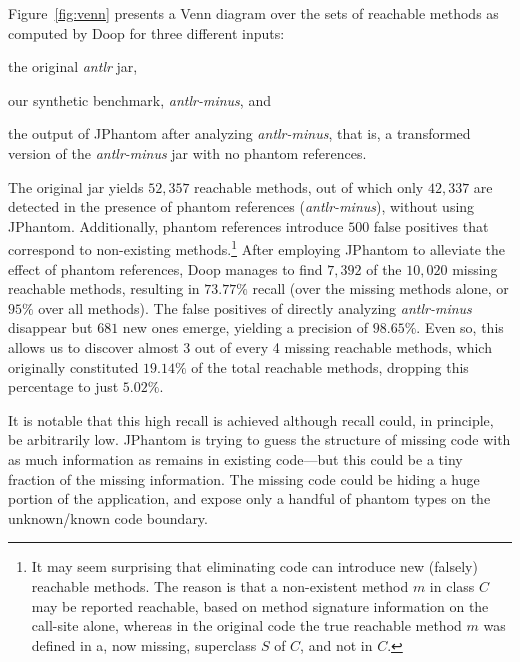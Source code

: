 \begin{itemize}
  Figure~\ref{fig:venn} presents a Venn diagram over the sets of
  reachable methods as computed by Doop for three different
  inputs:%
  \begin{inparaenum}[(i)]
  \item the original \emph{antlr} jar,
  \item our synthetic benchmark, \emph{antlr-minus}, and
  \item the output of JPhantom after analyzing \emph{antlr-minus},
    that is, a transformed version of the \emph{antlr-minus} jar with
    no phantom references.
  \end{inparaenum}
  The original jar yields $52,357$ reachable methods, out of which
  only $42,337$ are detected in the presence of phantom references
  (\emph{antlr-minus}), without using JPhantom. Additionally, phantom
  references introduce $500$ false positives that correspond to
  non-existing methods.\footnote{It may seem surprising that
    eliminating code can introduce new (falsely) reachable
    methods. The reason is that a non-existent method $m$ in class $C$
    may be reported reachable, based on method signature information
    on the call-site alone, whereas in the original code the true
    reachable method $m$ was defined in a, now missing, superclass $S$
    of $C$, and not in $C$.} After employing JPhantom to alleviate the
  effect of phantom references, Doop manages to find $7,392$ of the
  $10,020$ missing reachable methods, resulting in $73.77\%$ recall
  (over the missing methods alone, or $95\%$ over all methods). The
  false positives of directly analyzing \emph{antlr-minus} disappear
  but $681$ new ones emerge, yielding a precision of $98.65\%$. Even
  so, this allows us to discover almost 3 out of every 4 missing
  reachable methods, which originally constituted $19.14\%$ of the
  total reachable methods, dropping this percentage to just $5.02\%$.

  It is notable that this high recall is achieved although recall
  could, in principle, be arbitrarily low. JPhantom is trying to guess
  the structure of missing code with as much information as remains in
  existing code---but this could be a tiny fraction of the missing
  information. The missing code could be hiding a huge portion of the
  application, and expose only a handful of phantom types on the
  unknown/known code boundary.

\end{itemize}

